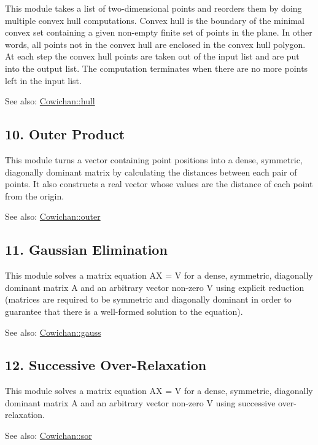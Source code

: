 This module takes a list of two-dimensional points and reorders them by doing multiple convex hull computations. Convex hull is the boundary of the minimal convex set containing a given non-empty finite set of points in the plane. In other words, all points not in the convex hull are enclosed in the convex hull polygon. At each step the convex hull points are taken out of the input list and are put into the output list. The computation terminates when there are no more points left in the input list. \begin{Desc}
\item[See also:]\hyperlink{class_cowichan_0c6b68ae3c059b66893405f8530a2e0a}{Cowichan::hull}\end{Desc}
\hypertarget{index_outer_sec}{}\subsection{10. Outer Product}\label{index_outer_sec}
This module turns a vector containing point positions into a dense, symmetric, diagonally dominant matrix by calculating the distances between each pair of points. It also constructs a real vector whose values are the distance of each point from the origin. \begin{Desc}
\item[See also:]\hyperlink{class_cowichan_52f17221019290b88334b0ca7f3bcdb9}{Cowichan::outer}\end{Desc}
\hypertarget{index_gauss_sec}{}\subsection{11. Gaussian Elimination}\label{index_gauss_sec}
This module solves a matrix equation AX = V for a dense, symmetric, diagonally dominant matrix A and an arbitrary vector non-zero V using explicit reduction (matrices are required to be symmetric and diagonally dominant in order to guarantee that there is a well-formed solution to the equation). \begin{Desc}
\item[See also:]\hyperlink{class_cowichan_aa9aac74b96dc5ed33e821d94649d1b2}{Cowichan::gauss}\end{Desc}
\hypertarget{index_sor_sec}{}\subsection{12. Successive Over-Relaxation}\label{index_sor_sec}
This module solves a matrix equation AX = V for a dense, symmetric, diagonally dominant matrix A and an arbitrary vector non-zero V using successive over-relaxation. \begin{Desc}
\item[See also:]\hyperlink{class_cowichan_92d8d9ae77208115fdfe69e1174f601c}{Cowichan::sor}\end{Desc}
